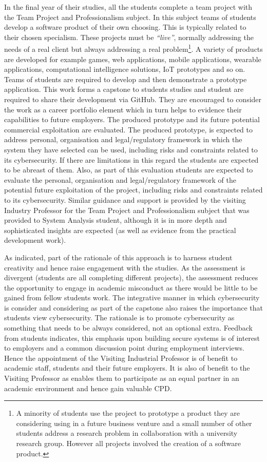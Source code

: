 \documentclass[conference]{IEEEtran}
\begin{document}
In the final year of their studies, all the students complete a team project with the Team Project and Professionalism subject. In this subject teams of students develop a software product of their own choosing. This is typically related to their chosen specialism. These projects must be {\em``live''}, normally addressing the needs of a real client but always addressing a real problem\footnote{A minority of students use the project to prototype a product they are considering using in a future business venture and a small number of other students address a research problem in collaboration with a university research group. However all projects involved the creation of a software product.}. A variety of products are developed for example games, web applications, mobile applications, wearable applications, computational intelligence solutions, IoT prototypes and so on. Teams of students are required to develop and then demonstrate a prototype application. This work forms a capstone to students studies and student are required to share their development via GitHub. They are encouraged to consider the work as a career portfolio element which in turn helps to evidence their capabilities to future employers. The produced prototype and its future potential commercial exploitation are evaluated. The produced prototype, is expected to address personal, organisation and legal/regulatory framework in which the system they have selected can be used, including risks and constraints related to its cybersecurity. If there are limitations in this regard the students are expected to be abreast of them. Also, as part of this evaluation students are expected to evaluate the personal, organisation and legal/regulatory framework of the potential future exploitation of the project, including risks and constraints related to its cybersecurity. Similar guidance and support is provided by the visiting Industry Professor for the Team Project and Professionalism subject that was provided to System Analysis student, although it is in more depth and  sophisticated insights are expected (as well as evidence from the practical development work).  

As indicated, part of the rationale of this approach is to harness student creativity and hence raise engagement with the studies. As the assessment is divergent {\cite{Bradley2016}} (students are all completing different projects), the assessment reduces the opportunity to engage in academic misconduct as there would be little to be gained from fellow students work. The integrative manner in which cybersecurity is consider and considering as part of the capstone also raises the importance that students view cybersecurity. The rationale is to promote cybersecurity as something that needs to be always considered, not an optional extra. Feedback from students indicates, this emphasis upon building secure systems is of interest to employers and a common discussion point during employment interviews. Hence the appointment of the Visiting Industrial Professor is of benefit to academic staff, students and their future employers. It is also of benefit to the Visiting Professor as enables them to participate as an equal partner in an academic environment and hence gain valuable CPD.
\end{document}
